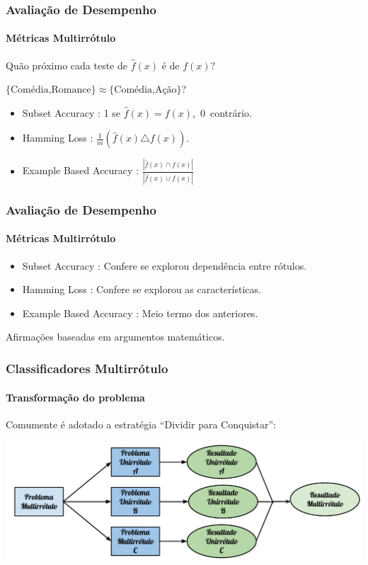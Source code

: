 \documentclass[10pt,fleqn]{beamer}
\newcommand{\litem}[1]{
  \item{#1 \vspace{9pt}}
}
\begin{document}
\begin{frame}
  \frametitle{Avaliação de Desempenho}
  \framesubtitle{Métricas Multirrótulo}
  Quão próximo cada teste de $\hat{f}(x)$ é de $f(x)$?
  \begin{center}
  $\{\textrm{Comédia,Romance}\} \approx \{\textrm{Comédia,Ação}\}$?
  \end{center}
  
  \begin{itemize}
  \litem{Subset Accuracy}: 1 se $\hat{f}(x)=f(x)$,~$0$~contrário.
  \litem{Hamming Loss}: $\frac{1}{m}(\hat{f}(x) \triangle f(x))$. 
  \litem{Example Based Accuracy}: \large{$\frac{|\hat{f}(x) \cap f(x)|}{|\hat{f}(x) \cup f(x)|}$}
  
  \end{itemize}
\end{frame}

\begin{frame}
  \frametitle{Avaliação de Desempenho}
  \framesubtitle{Métricas Multirrótulo}
  \begin{itemize}
  \litem{Subset Accuracy}: Confere se explorou dependência entre rótulos.
  \litem{Hamming Loss}: Confere se explorou as características.
  \litem{Example Based Accuracy}: Meio termo dos anteriores.
  \end{itemize}
  \begin{block}{}
Afirmações baseadas em argumentos matemáticos.
 \end{block}
 
\end{frame}


\begin{frame}
  \frametitle{Classificadores Multirrótulo}
  \framesubtitle{Transformação do problema}
  
  Comumente é adotado a estratégia ``Dividir para Conquistar'':
    \begin{center}
  \includegraphics[scale=0.53]{transformar}
    \end{center}
\end{frame}
\end{document}
